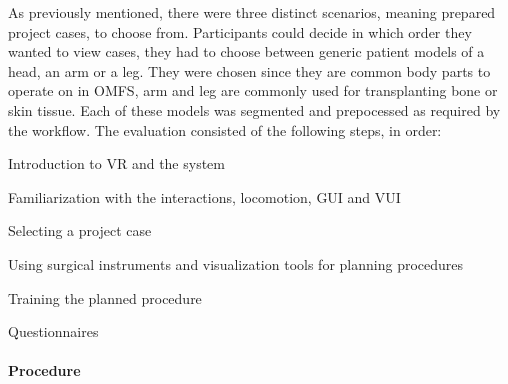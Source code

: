 As previously mentioned, there were three distinct scenarios, meaning prepared project cases, to choose from.
Participants could decide in which order they wanted to view cases, they had to choose between generic patient models of a head, an arm or a leg.
They were chosen since they are common body parts to operate on in OMFS, arm and leg are commonly used for transplanting bone or skin tissue.
Each of these models was segmented and prepocessed as required by the workflow.
The evaluation consisted of the following steps, in order:

\begin{compactenum}[label=(\alph*)]
    \item Introduction to VR and the system
    \item Familiarization with the interactions, locomotion, GUI and VUI
    \item Selecting a project case
    \item Using surgical instruments and visualization tools for planning procedures
    \item Training the planned procedure 
    \item Questionnaires
\end{compactenum}

\paragraph{\textbf{Procedure}}

